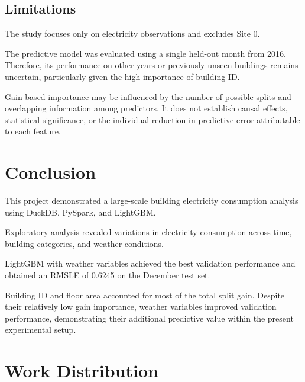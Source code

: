 \documentclass[12pt]{article}
\begin{document}
\subsection{Limitations}

The study focuses only on electricity observations and excludes Site 0.

The predictive model was evaluated using a single held-out month from 2016. Therefore, its performance on other years or previously unseen buildings remains uncertain, particularly given the high importance of building ID.

Gain-based importance may be influenced by the number of possible splits and overlapping information among predictors. It does not establish causal effects, statistical significance, or the individual reduction in predictive error attributable
to each feature.

\section{Conclusion}

This project demonstrated a large-scale building electricity consumption analysis using DuckDB, PySpark, and LightGBM.

Exploratory analysis revealed variations in electricity consumption across time, building categories, and weather conditions.

LightGBM with weather variables achieved the best validation performance and obtained an RMSLE of 0.6245 on the December test set.

Building ID and floor area accounted for most of the total split gain. Despite their relatively low gain importance, weather variables improved validation performance, demonstrating their additional predictive value within the present experimental setup.


\clearpage
\printbibliography[heading=bibintoc,title={References}]

\clearpage
\appendix

\section{Work Distribution}
\label{app:work-distribution}
\end{document}
